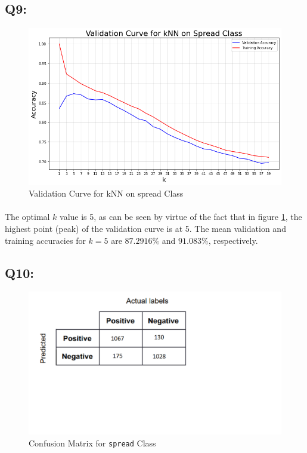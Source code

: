 \documentclass{article}
\newcommand{\code}[1]{\texttt{#1}}
\begin{document}
\subsection*{Q9:}
    \begin{figure}[H]
        \centering
        \includegraphics[scale=0.5]{q9.png}
        \caption{Validation Curve for kNN on spread Class}
        \label{fig:q9}
    \end{figure}
    \paragraph*{}
    The optimal $k$ value is 5, as can be seen by virtue of the fact that in figure \ref{fig:q9}, the highest point (peak) of the validation curve is at 5. The mean validation and training accuracies for $k=5$ are $87.2916\%$ and $91.083\%$, respectively.
\subsection*{Q10:}
    \begin{figure}[H]
        \centering
        \includegraphics[scale=0.7]{q10.png}
        \caption{Confusion Matrix for \code{spread} Class}
        \label{fig:q10}
    \end{figure}
\end{document}
